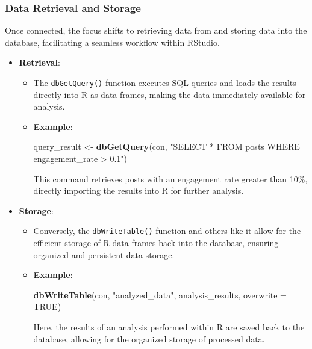 \documentclass[
]{book}
\newenvironment{Shaded}{\begin{snugshade}}{\end{snugshade}}
\newcommand{\AttributeTok}[1]{\textcolor[rgb]{0.13,0.29,0.53}{#1}}
\newcommand{\ConstantTok}[1]{\textcolor[rgb]{0.56,0.35,0.01}{#1}}
\newcommand{\FunctionTok}[1]{\textcolor[rgb]{0.13,0.29,0.53}{\textbf{#1}}}
\newcommand{\NormalTok}[1]{#1}
\newcommand{\OtherTok}[1]{\textcolor[rgb]{0.56,0.35,0.01}{#1}}
\newcommand{\StringTok}[1]{\textcolor[rgb]{0.31,0.60,0.02}{#1}}
\providecommand{\tightlist}{%
  \setlength{\itemsep}{0pt}\setlength{\parskip}{0pt}}
\begin{document}
\hypertarget{data-retrieval-and-storage}{%
\subsubsection{Data Retrieval and Storage}\label{data-retrieval-and-storage}}

Once connected, the focus shifts to retrieving data from and storing data into the database, facilitating a seamless workflow within RStudio.

\begin{itemize}
\tightlist
\item
  \textbf{Retrieval}:

  \begin{itemize}
  \item
    The \texttt{dbGetQuery()} function executes SQL queries and loads the results directly into R as data frames, making the data immediately available for analysis.
  \item
    \textbf{Example}:

\begin{Shaded}
\begin{Highlighting}[]
\NormalTok{query\_result }\OtherTok{\textless{}{-}} \FunctionTok{dbGetQuery}\NormalTok{(con, }\StringTok{"SELECT * FROM posts WHERE engagement\_rate \textgreater{} 0.1"}\NormalTok{)}
\end{Highlighting}
\end{Shaded}

    This command retrieves posts with an engagement rate greater than 10\%, directly importing the results into R for further analysis.
  \end{itemize}
\item
  \textbf{Storage}:

  \begin{itemize}
  \item
    Conversely, the \texttt{dbWriteTable()} function and others like it allow for the efficient storage of R data frames back into the database, ensuring organized and persistent data storage.
  \item
    \textbf{Example}:

\begin{Shaded}
\begin{Highlighting}[]
\FunctionTok{dbWriteTable}\NormalTok{(con, }\StringTok{"analyzed\_data"}\NormalTok{, analysis\_results, }\AttributeTok{overwrite =} \ConstantTok{TRUE}\NormalTok{)}
\end{Highlighting}
\end{Shaded}

    Here, the results of an analysis performed within R are saved back to the database, allowing for the organized storage of processed data.
  \end{itemize}
\end{itemize}
\end{document}
